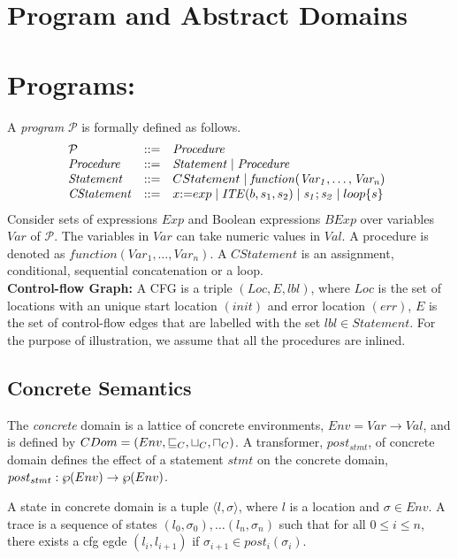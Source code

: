 \section{Program and Abstract Domains}
\section{Programs:}
%
A {\em program} $\mathcal{P}$ is formally defined as follows.
\[
\begin{array}[t]{@{}lll}
\mathcal{P} & {:}{:}{=} & \mathit{Procedure} \\
\mathit{Procedure} & {:}{:}{=} & \mathit{Statement} \mid \mathit{Procedure} \\
\mathit{Statement} & {:}{:}{=} & CStatement \mid \mathit{function(Var_1,\dots,Var_n)} \\
\mathit{CStatement} & {:}{:}{=} & x {:}{=} exp \mid \mathit{ITE}(b, s_1,s_2) \mid \mathit{s_1;s_2} \mid loop\{s\} \\
\end{array}
\]
Consider sets of expressions $Exp$ and Boolean expressions $BExp$
over variables $Var$ of $\mathcal{P}$.  The variables in $Var$ 
can take numeric values in $Val$.  A procedure is denoted as 
$\mathit{function(Var_1,\dots,Var_n)}$.  A $\mathit{CStatement}$ 
is an assignment, conditional, sequential concatenation or a loop. \\

\textbf{Control-flow Graph:} A CFG is a triple $(Loc, E, lbl)$, 
where $Loc$ is the set of locations with an unique start 
location $(init)$ and error location $(err)$, $E$ is the set 
of control-flow edges that are labelled with the set 
$lbl \in Statement$.  For the purpose of illustration, we 
assume that all the procedures are inlined.  

\subsection{Concrete Semantics}
The {\em concrete} domain is a lattice 
of concrete environments, $Env = Var \rightarrow Val$, and is 
defined by $CDom = (Env, \sqsubseteq_{C}, \sqcup_{C}, \sqcap_{C})$.
A transformer, $post_{stmt}$, of concrete domain defines 
the effect of a statement $stmt$ on the concrete domain, 
$post_{stmt} : \wp(Env) \rightarrow \wp(Env)$.  

A state in concrete domain is a tuple $\langle l, \sigma \rangle$, 
where $l$ is a location and $\sigma \in Env$.  A trace is a sequence 
of states $(l_0, \sigma_0), \ldots (l_n, \sigma_n)$ such that for all 
$0 \leq i \leq n$, there exists a cfg egde $(l_{i}, l_{i+1})$ 
if $\sigma_{i+1} \in post_{i}(\sigma_{i})$. 
 
